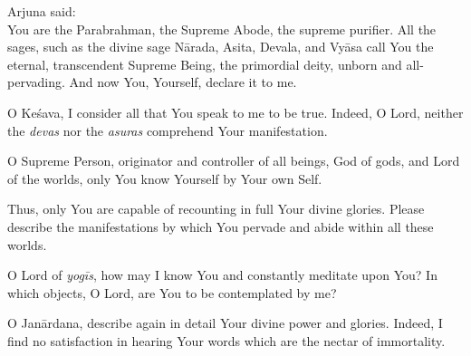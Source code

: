 {\hspace*{1em}Arjuna said: \\
You are the Parabrahman, the Supreme Abode, the supreme purifier. All the sages, such as the divine sage Nārada, Asita, Devala, and Vyāsa call You the eternal, transcendent Supreme Being, the primordial deity, unborn and all-pervading. And now You, Yourself, declare it to me.}

{O Keśava, I consider all that You speak to me to be true. Indeed, O Lord, neither the \textit{devas} nor the \textit{asuras} comprehend Your manifestation.}

{O Supreme Person, originator and controller of all beings, God of gods, and Lord of the worlds, only You know Yourself by Your own Self.}

{Thus, only You are capable of recounting in full Your divine glories. Please describe the manifestations by which You pervade and abide within all these worlds.}

{O Lord of \textit{yogīs}, how may I know You and constantly meditate upon You? In which objects, O Lord, are You to be contemplated by me?}

{O Janārdana, describe again in detail Your divine power and glories. Indeed, I find no satisfaction in hearing Your words which are the nectar of immortality.}



